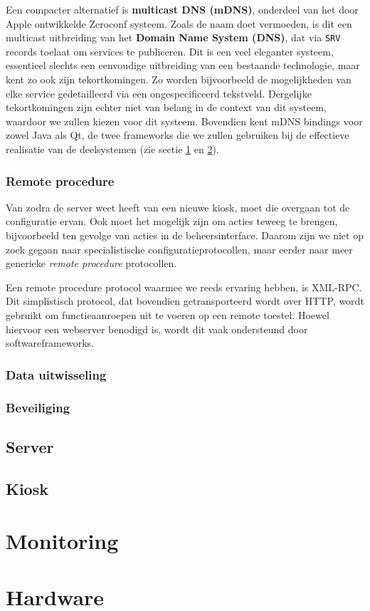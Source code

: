 Een compacter alternatief is \textbf{multicast DNS (mDNS)}, onderdeel van het door Apple ontwikkelde Zeroconf systeem. Zoals de naam doet vermoeden, is dit een multicast uitbreiding van het \textbf{Domain Name System (DNS)}, dat via \texttt{SRV} records toelaat om services te publiceren. Dit is een veel eleganter systeem, essentieel slechts een eenvoudige uitbreiding van een bestaande technologie, maar kent zo ook zijn tekortkomingen. Zo worden bijvoorbeeld de mogelijkheden van elke service gedetailleerd via een ongespecificeerd tekstveld. Dergelijke tekortkomingen zijn echter niet van belang in de context van dit systeem, waardoor we zullen kiezen voor dit systeem. Bovendien kent mDNS bindings voor zowel Java als Qt, de twee frameworks die we zullen gebruiken bij de effectieve realisatie van de deelsystemen (zie sectie \ref{sec:server} en \ref{sec:kiosk}).

\subsection{Remote procedure}

Van zodra de server weet heeft van een nieuwe kiosk, moet die overgaan tot de configuratie ervan. Ook moet het mogelijk zijn om acties teweeg te brengen, bijvoorbeeld ten gevolge van acties in de beheersinterface. Daarom zijn we niet op zoek gegaan naar specialistische configuratieprotocollen, maar eerder naar meer generieke \emph{remote procedure} protocollen.

Een remote procedure protocol waarmee we reeds ervaring hebben, is XML-RPC. Dit simplistisch protocol, dat bovendien getransporteerd wordt over HTTP, wordt gebruikt om functieaanroepen uit te voeren op een remote toestel. Hoewel hiervoor een webserver benodigd is, wordt dit vaak ondersteund door softwareframeworks.

\subsection{Data uitwisseling}

\subsection{Beveiliging}

\section{Server}
\label{sec:server}

\section{Kiosk}
\label{sec:kiosk}


%
%

\chapter{Monitoring}
\label{chap:monitoring}


%
%

\chapter{Hardware}
\label{chap:hardware}

